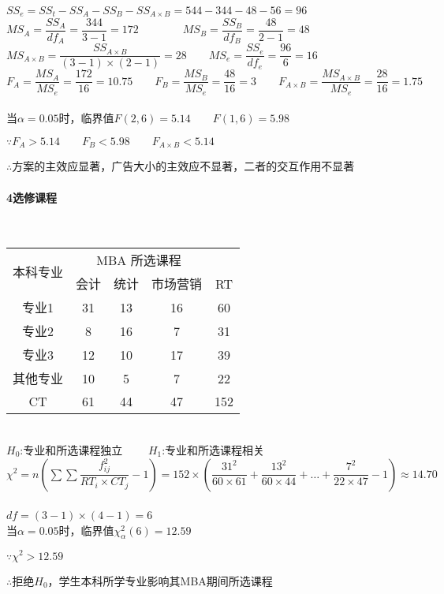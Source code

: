 \documentclass[UTF8]{ctexart}
\begin{document}
$SS_e=SS_t-SS_A-SS_B-SS_{A\times B}=544-344-48-56=96$
~\\

$MS_A=\dfrac{SS_A}{df_A}=\dfrac{344}{3-1}=172 
\qquad\qquad 
MS_B=\dfrac{SS_B}{df_B}=\dfrac{48}{2-1}=48$
~\\

$MS_{A\times B}=\dfrac{SS_{A\times  B}}{(3-1)\times(2-1)}=28 
\qquad 
MS_e=\dfrac{SS_e}{df_e}=\dfrac{96}{6}=16$
~\\

$F_A=\dfrac{MS_A}{MS_e}=\dfrac{172}{16}=10.75
\qquad
F_B=\dfrac{MS_B}{MS_e}=\dfrac{48}{16}=3
\qquad
F_{A\times B}=\dfrac{MS_{A\times B}}{MS_e}=\dfrac{28}{16}=1.75$
~\\

当$\alpha=0.05$时，临界值$F(2,6)=5.14 \qquad F(1,6)=5.98$

$\because F_A > 5.14 \qquad F_B < 5.98 \qquad F_{A\times B} < 5.14$

$\therefore$方案的主效应显著，广告大小的主效应不显著，二者的交互作用不显著


\paragraph{4选修课程}
~\\

\begin{tabular}{ccccc}
\toprule
\multirow{2}{*}{本科专业} & \multicolumn{3}{c}{MBA 所选课程}  \\
\cmidrule{2-4}
 & 会计 & 统计 & 市场营销 & RT \\
\midrule
专业1 & 31 & 13 & 16 & 60 \\
专业2 & 8 & 16 & 7 & 31 \\
专业3 & 12 & 10 & 17 & 39 \\
其他专业 & 10 & 5 & 7 & 22 \\
CT & 61 & 44 & 47 & 152 \\

\bottomrule
\end{tabular}

~\\

$H_0$:专业和所选课程独立 $\qquad H_1$:专业和所选课程相关
~\\

$\chi^2=n\left(\sum\sum\dfrac{f_{ij}^2}{RT_i\times CT_j}-1\right)=152\times\left(\dfrac{31^2}{60\times61}+\dfrac{13^2}{60\times44}+\dots+\dfrac{7^2}{22\times47}-1\right)\approx14.70$
~\\

$df=(3-1)\times(4-1)=6$
~\\

当$\alpha=0.05$时，临界值$\chi_\alpha^2(6)=12.59$

$\because \chi^2 > 12.59$

$\therefore$拒绝$H_0$，学生本科所学专业影响其MBA期间所选课程
\end{document}
